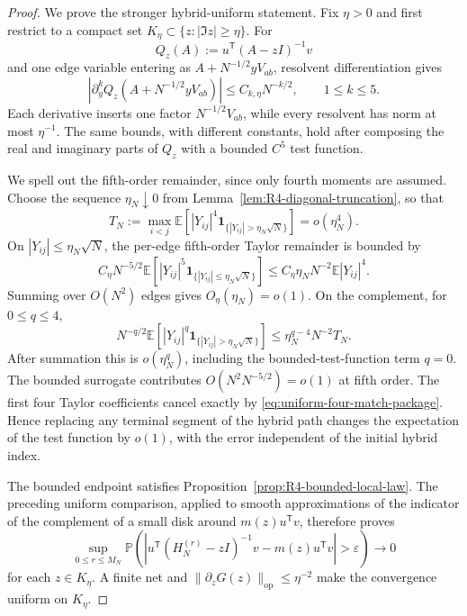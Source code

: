 \documentclass[11pt]{article}
\theoremstyle{definition}
\theoremstyle{remark}
\newcommand{\E}{\mathbb E}
\newcommand{\op}{\mathrm{op}}
\newcommand{\one}{\mathbf 1}
\newcommand{\norm}[1]{\lVert #1\rVert}
\begin{document}
\begin{proof}
We prove the stronger hybrid-uniform statement.  Fix \(\eta>0\) and first
restrict to a compact set
\(K_\eta\subset\{z:|\Im z|\ge\eta\}\).  For
\[
 Q_z(A):=u^{\mathsf T}(A-zI)^{-1}v
\]
and one edge variable entering as
\(A+N^{-1/2}yV_{ab}\), resolvent differentiation gives
\begin{equation}\label{eq:R4-isotropic-edge-derivatives}
 \left|\partial_y^k
 Q_z(A+N^{-1/2}yV_{ab})\right|
 \le C_{k,\eta}N^{-k/2},
 \qquad 1\le k\le5.
\end{equation}
Each derivative inserts one factor \(N^{-1/2}V_{ab}\), while every
resolvent has norm at most \(\eta^{-1}\).  The same bounds, with different
constants, hold after composing the real and imaginary parts of \(Q_z\) with
a bounded \(C^5\) test function.

We spell out the fifth-order remainder, since only fourth moments are
assumed.  Choose the sequence \(\eta_N\downarrow0\) from
Lemma~\ref{lem:R4-diagonal-truncation}, so that
\[
 T_N:=\max_{i<j}\E\left[|Y_{ij}|^4
 \one_{\{|Y_{ij}|>\eta_N\sqrt N\}}\right]
 =o(\eta_N^4).
\]
On \(|Y_{ij}|\le\eta_N\sqrt N\), the per-edge fifth-order Taylor remainder
is bounded by
\begin{equation}\label{eq:R4-isotropic-fifth-remainder}
 C_\eta N^{-5/2}
 \E\left[|Y_{ij}|^5
 \one_{\{|Y_{ij}|\le\eta_N\sqrt N\}}\right]
 \le C_\eta\eta_NN^{-2}\E|Y_{ij}|^4.
\end{equation}
Summing over \(O(N^2)\) edges gives \(O_\eta(\eta_N)=o(1)\).  On the
complement, for \(0\le q\le4\),
\[
 N^{-q/2}\E\left[|Y_{ij}|^q
 \one_{\{|Y_{ij}|>\eta_N\sqrt N\}}\right]
 \le \eta_N^{q-4}N^{-2}T_N.
\]
After summation this is \(o(\eta_N^q)\), including the bounded-test-function
term \(q=0\).  The bounded surrogate contributes
\(O(N^2N^{-5/2})=o(1)\) at fifth order.  The first four Taylor coefficients
cancel exactly by \eqref{eq:uniform-four-match-package}.  Hence replacing any
terminal segment of the hybrid path changes the expectation of the test
function by \(o(1)\), with the error independent of the initial hybrid
index.

The bounded endpoint satisfies Proposition~\ref{prop:R4-bounded-local-law}.
The preceding uniform comparison, applied to smooth approximations of the
indicator of the complement of a small disk around
\(m(z)u^{\mathsf T}v\), therefore proves
\[
 \sup_{0\le r\le M_N}
 \mathbb P\left(
 \left|u^{\mathsf T}(H_N^{(r)}-zI)^{-1}v
 -m(z)u^{\mathsf T}v\right|>\varepsilon
 \right)\longrightarrow0
\]
for each \(z\in K_\eta\).  A finite net and
\(\norm{\partial_zG(z)}_{\op}\le\eta^{-2}\) make the convergence uniform on
\(K_\eta\).


\end{proof}
\end{document}
